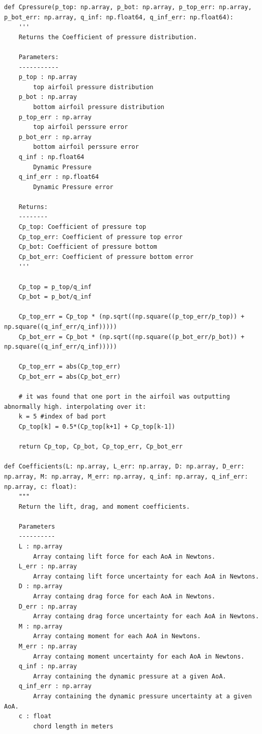\documentclass[11pt, letterpaper]{article}
\begin{document}
\begin{appendices}
\begin{verbatim}
def Cpressure(p_top: np.array, p_bot: np.array, p_top_err: np.array, p_bot_err: np.array, q_inf: np.float64, q_inf_err: np.float64):
    '''
    Returns the Coefficient of pressure distribution.

    Parameters:
    -----------   
    p_top : np.array
        top airfoil pressure distribution
    p_bot : np.array
        bottom airfoil pressure distribution
    p_top_err : np.array
        top airfoil perssure error
    p_bot_err : np.array
        bottom airfoil perssure error
    q_inf : np.float64
        Dynamic Pressure
    q_inf_err : np.float64
        Dynamic Pressure error

    Returns:
    --------
    Cp_top: Coefficient of pressure top
    Cp_top_err: Coefficient of pressure top error
    Cp_bot: Coefficient of pressure bottom
    Cp_bot_err: Coefficient of pressure bottom error
    '''

    Cp_top = p_top/q_inf
    Cp_bot = p_bot/q_inf

    Cp_top_err = Cp_top * (np.sqrt((np.square((p_top_err/p_top)) + np.square((q_inf_err/q_inf)))))
    Cp_bot_err = Cp_bot * (np.sqrt((np.square((p_bot_err/p_bot)) + np.square((q_inf_err/q_inf)))))

    Cp_top_err = abs(Cp_top_err)
    Cp_bot_err = abs(Cp_bot_err)

    # it was found that one port in the airfoil was outputting abnormally high. interpolating over it:
    k = 5 #index of bad port 
    Cp_top[k] = 0.5*(Cp_top[k+1] + Cp_top[k-1])

    return Cp_top, Cp_bot, Cp_top_err, Cp_bot_err

def Coefficients(L: np.array, L_err: np.array, D: np.array, D_err: np.array, M: np.array, M_err: np.array, q_inf: np.array, q_inf_err: np.array, c: float):
    """
    Return the lift, drag, and moment coefficients.

    Parameters
    ----------
    L : np.array
        Array containg lift force for each AoA in Newtons.
    L_err : np.array
        Array containg lift force uncertainty for each AoA in Newtons.
    D : np.array
        Array containg drag force for each AoA in Newtons.
    D_err : np.array
        Array containg drag force uncertainty for each AoA in Newtons.
    M : np.array
        Array containg moment for each AoA in Newtons.
    M_err : np.array
        Array containg moment uncertainty for each AoA in Newtons.
    q_inf : np.array
        Array containing the dynamic pressure at a given AoA.
    q_inf_err : np.array
        Array containing the dynamic pressure uncertainty at a given AoA.
    c : float
        chord length in meters
        

\end{verbatim}
\end{appendices}
\end{document}
